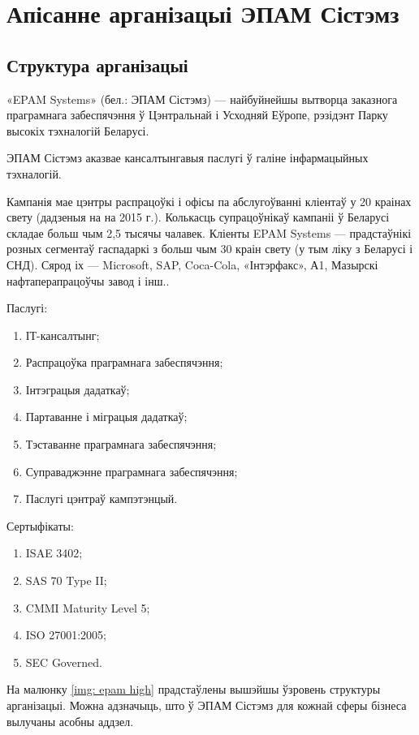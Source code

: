 \section{Апісанне арганізацыі ЭПАМ Сістэмз}

\subsection{Структура арганізацыі}
«EPAM Systems» (бел.: ЭПАМ Сістэмз) --- найбуйнейшы вытворца заказнога праграмнага забеспячэння ў Цэнтральнай і Усходняй Еўропе, рэзідэнт Парку высокіх тэхналогій Беларусі.

ЭПАМ Сістэмз аказвае кансалтынгавыя паслугі ў галіне інфармацыйных тэхналогій. 

Кампанія мае цэнтры распрацоўкі і офісы па абслугоўванні кліентаў у 20 краінах свету (дадзеныя на на 2015 г.). Колькасць супрацоўнікаў кампаніі ў Беларусі складае больш чым 2,5 тысячы чалавек. Кліенты EPAM Systems --- прадстаўнікі розных сегментаў гаспадаркі з больш чым 30 краін свету (у тым ліку з Беларусі і СНД). Сярод іх --- Microsoft, SAP, Coca-Cola, «Інтэрфакс», А1, Мазырскі нафтаперапрацоўчы завод і інш..

Паслугі:
\begin{enumerate}
    \item ІТ-кансалтынг;
    \item Распрацоўка праграмнага забеспячэння;
    \item Інтэграцыя дадаткаў;
    \item Партаванне і міграцыя дадаткаў;
    \item Тэставанне праграмнага забеспячэння;
    \item Суправаджэнне праграмнага забеспячэння;
    \item Паслугі цэнтраў кампэтэнцый.
\end{enumerate}

Сертыфікаты:
\begin{enumerate}
    \item ISAE 3402;
    \item SAS 70 Type II;
    \item CMMI Maturity Level 5;
    \item ISO 27001:2005;
    \item SEC Governed.
\end{enumerate}

На малюнку \ref{img: epam high} прадстаўлены вышэйшы ўзровень структуры арганізацыі. Можна адзначыць,
што ў ЭПАМ Сістэмз для кожнай сферы бізнеса вылучаны асобны аддзел.

